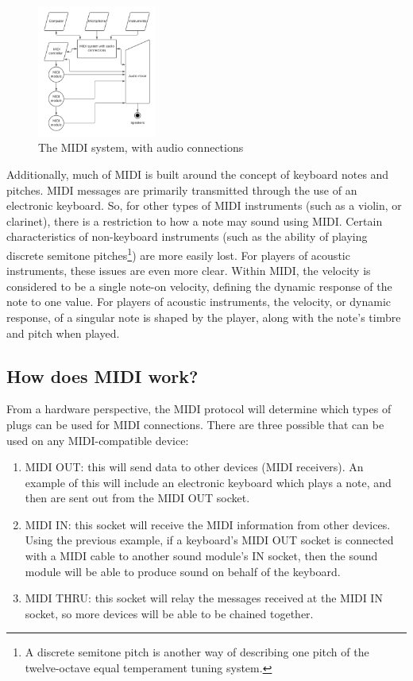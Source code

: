 \begin{figure}
	\centering
	\includegraphics[width=0.35\textwidth]{figures/midi-system-with-audio-connections.png}
	\caption{The MIDI system, with audio connections}
	\label{fig:midi-system-with-audio-connections}
\end{figure}

Additionally, much of MIDI is built around the concept of keyboard notes and pitches. MIDI messages are primarily transmitted through the use of an electronic keyboard. So, for other types of MIDI instruments (such as a violin, or clarinet), there is a restriction to how a note may sound using MIDI. Certain characteristics of non-keyboard instruments (such as the ability of playing discrete semitone pitches\footnote{A discrete semitone pitch is another way of describing one pitch of the twelve-octave equal temperament tuning system.}) are more easily lost. For players of acoustic instruments, these issues are even more clear. Within MIDI, the velocity is considered to be a single note-on velocity, defining the dynamic response of the note to one value. For players of acoustic instruments, the velocity, or dynamic response, of a singular note is shaped by the player, along with the note's timbre and pitch when played\cite{Kirk_Hunt_2013}.

\subsection[How does MIDI work?]{How does MIDI work?}\label{subsection:how-midi}
From a hardware perspective, the MIDI protocol will determine which types of plugs can be used for MIDI connections. There are three possible  that can be used on any MIDI-compatible device:

\begin{enumerate}
	\item MIDI OUT: this will send data to other devices (MIDI receivers). An example of this will include an electronic keyboard which plays a note, and then  are sent out from the MIDI OUT socket.
	\item MIDI IN: this socket will receive the MIDI information from other devices. Using the previous example, if a keyboard's MIDI OUT socket is connected with a MIDI cable to another sound module's IN socket, then the sound module will be able to produce sound on behalf of the keyboard.
	\item MIDI THRU: this socket will relay the messages received at the MIDI IN socket, so more devices will be able to be chained together.
\end{enumerate}

